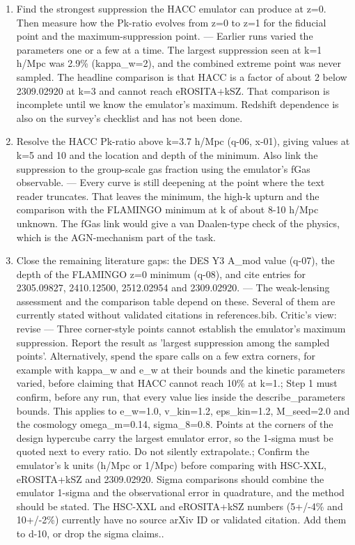 \documentclass[11pt,a4paper]{article}
\begin{document}
\begin{enumerate}
  \item Find the strongest suppression the HACC emulator can produce at z=0. Then measure how the Pk-ratio evolves from z=0 to z=1 for the fiducial point and the maximum-suppression point. --- Earlier runs varied the parameters one or a few at a time. The largest suppression seen at k=1 h/Mpc was 2.9\% (kappa\_w=2), and the combined extreme point was never sampled. The headline comparison is that HACC is a factor of about 2 below 2309.02920 at k=3 and cannot reach eROSITA+kSZ. That comparison is incomplete until we know the emulator's maximum. Redshift dependence is also on the survey's checklist and has not been done.
  \item Resolve the HACC Pk-ratio above k=3.7 h/Mpc (q-06, x-01), giving values at k=5 and 10 and the location and depth of the minimum. Also link the suppression to the group-scale gas fraction using the emulator's fGas observable. --- Every curve is still deepening at the point where the text reader truncates. That leaves the minimum, the high-k upturn and the comparison with the FLAMINGO minimum at k of about 8-10 h/Mpc unknown. The fGas link would give a van Daalen-type check of the physics, which is the AGN-mechanism part of the task.
  \item Close the remaining literature gaps: the DES Y3 A\_mod value (q-07), the depth of the FLAMINGO z=0 minimum (q-08), and cite entries for 2305.09827, 2410.12500, 2512.02954 and 2309.02920. --- The weak-lensing assessment and the comparison table depend on these. Several of them are currently stated without validated citations in references.bib.
Critic's view: revise --- Three corner-style points cannot establish the emulator's maximum suppression. Report the result as 'largest suppression among the sampled points'. Alternatively, spend the spare calls on a few extra corners, for example with kappa\_w and e\_w at their bounds and the kinetic parameters varied, before claiming that HACC cannot reach 10\% at k=1.; Step 1 must confirm, before any run, that every value lies inside the describe\_parameters bounds. This applies to e\_w=1.0, v\_kin=1.2, eps\_kin=1.2, M\_seed=2.0 and the cosmology omega\_m=0.14, sigma\_8=0.8. Points at the corners of the design hypercube carry the largest emulator error, so the 1-sigma must be quoted next to every ratio. Do not silently extrapolate.; Confirm the emulator's k units (h/Mpc or 1/Mpc) before comparing with HSC-XXL, eROSITA+kSZ and 2309.02920. Sigma comparisons should combine the emulator 1-sigma and the observational error in quadrature, and the method should be stated. The HSC-XXL and eROSITA+kSZ numbers (5+/-4\% and 10+/-2\%) currently have no source arXiv ID or validated citation. Add them to d-10, or drop the sigma claims..

\end{enumerate}
\end{document}
